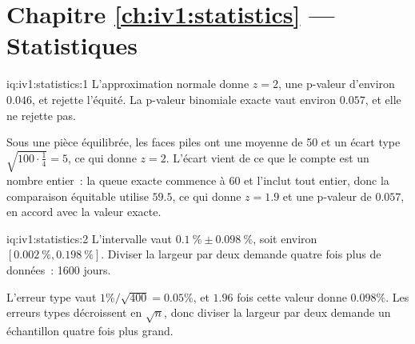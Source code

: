 \section*{Chapitre \ref{ch:iv1:statistics} --- Statistiques}

\begin{solution}{iq:iv1:statistics:1}
L'approximation normale donne $z = 2$, une p-valeur d'environ $0.046$, et rejette l'équité. La p-valeur binomiale exacte vaut environ $0.057$, et elle ne rejette pas.

Sous une pièce équilibrée, les faces piles ont une moyenne de 50 et un écart type $\sqrt{100 \cdot \frac14} = 5$, ce qui donne $z = 2$. L'écart vient de ce que le compte est un nombre entier~: la queue exacte commence à 60 et l'inclut tout entier, donc la comparaison équitable utilise $59.5$, ce qui donne $z = 1.9$ et une p-valeur de $0.057$, en accord avec la valeur exacte.

\end{solution}

\begin{solution}{iq:iv1:statistics:2}
L'intervalle vaut $0.1~\% \pm 0.098~\%$, soit environ $[0.002~\%, 0.198~\%]$. Diviser la largeur par deux demande quatre fois plus de données~: 1600 jours.

L'erreur type vaut $1\%/\sqrt{400} = 0.05\%$, et $1.96$ fois cette valeur donne $0.098\%$. Les erreurs types décroissent en $\sqrt{n}$, donc diviser la largeur par deux demande un échantillon quatre fois plus grand.

\end{solution}

